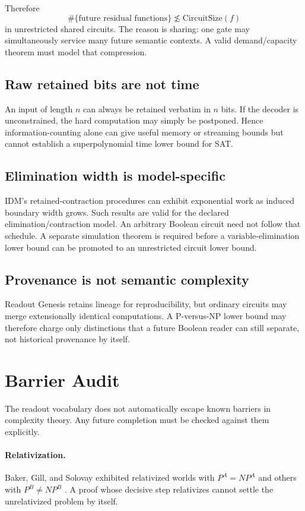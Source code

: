 \documentclass[11pt]{article}
\newcommand{\CircuitSize}{\mathrm{CircuitSize}}
\begin{document}
Therefore
\[
\boxed{
\#\{\text{future residual functions}\}
\not\lesssim
\CircuitSize(f)
}
\]
in unrestricted shared circuits. The reason is sharing: one gate may simultaneously service many future semantic contexts. A valid demand/capacity theorem must model that compression.

\subsection{Raw retained bits are not time}

An input of length $n$ can always be retained verbatim in $n$ bits. If the decoder is unconstrained, the hard computation may simply be postponed. Hence information-counting alone can give useful memory or streaming bounds but cannot establish a superpolynomial time lower bound for SAT.

\subsection{Elimination width is model-specific}

IDM's retained-contraction procedures can exhibit exponential work as induced boundary width grows. Such results are valid for the declared elimination/contraction model. An arbitrary Boolean circuit need not follow that schedule. A separate simulation theorem is required before a variable-elimination lower bound can be promoted to an unrestricted circuit lower bound.

\subsection{Provenance is not semantic complexity}

Readout Genesis retains lineage for reproducibility, but ordinary circuits may merge extensionally identical computations. A P-versus-NP lower bound may therefore charge only distinctions that a future Boolean reader can still separate, not historical provenance by itself.

\section{Barrier Audit}

The readout vocabulary does not automatically escape known barriers in complexity theory. Any future completion must be checked against them explicitly.

\paragraph{Relativization.}
Baker, Gill, and Solovay exhibited relativized worlds with $P^A=NP^A$ and others with $P^B\neq NP^B$ \cite{BGS75}. A proof whose decisive step relativizes cannot settle the unrelativized problem by itself.
\end{document}
